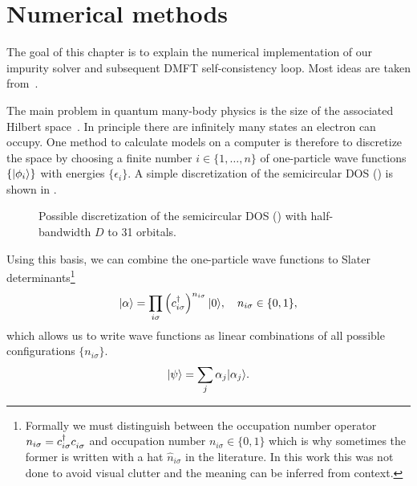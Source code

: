 
\chapter{Numerical methods}%
\label{ch:numerical-methods}

The goal of this chapter is to explain the numerical implementation of our
impurity solver and subsequent DMFT self-consistency loop.
Most ideas are taken from~\cite{Lu2014, Lu2019, Kugler2022, Zacinskis2025}.

The main problem in quantum many-body physics is the size of
the associated Hilbert space~\cite{Brass2021}.
In principle there are infinitely many states an electron can occupy.
One method to calculate models on a computer is therefore to discretize the space
by choosing a finite number $i\in\{1,\ldots,n\}$ of one-particle wave functions $\{\lvert\phi_i\rangle\}$
with energies $\{\epsilon_i\}$.
A simple discretization of the semicircular DOS ()
is shown in .
\begin{figure}[ht]
    \centering
    
    \caption{
        Possible discretization of the semicircular DOS ()
        with half-bandwidth $D$ to 31 orbitals.
    }%
    \label{fig:dos-discretization}
\end{figure}
Using this basis,
we can combine the one-particle wave functions to Slater determinants\footnote{
    Formally we must distinguish between the occupation number operator
    $n_{i\sigma} = c^\dag_{i\sigma} c^{\pdag}_{i\sigma}$ and
    occupation number $n_{i\sigma} \in \{0, 1\}$
    which is why sometimes the former is written with a hat $\hat n_{i\sigma}$ in the literature.
    In this work this was not done to avoid visual clutter
    and the meaning can be inferred from context.
}
\begin{equation}
    \lvert\alpha\rangle = \prod_{i\sigma} \left(c^\dag_{i\sigma}\right)^{n_{i\sigma}} \lvert0\rangle,
    \quad
    n_{i\sigma}\in\{0,1\},
\end{equation}
which allows us to write wave functions as linear combinations of all possible configurations
$\{n_{i\sigma}\}$.
\begin{equation}
    \lvert\psi\rangle = \sum_j \alpha_j \lvert\alpha_j\rangle.
\end{equation}

